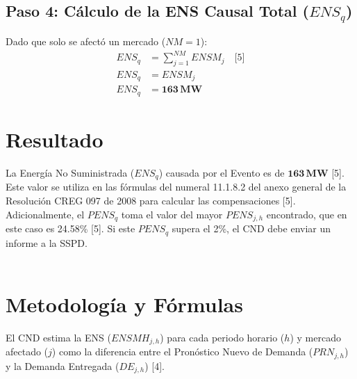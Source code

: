 \documentclass[a5paper]{book}%
\begin{document}
  \subsection*{Paso 4: Cálculo de la ENS Causal Total ($ENS_q$)}
  
  Dado que solo se afectó un mercado ($NM=1$):
  \begin{align*}
  	ENS_q &= \sum_{j=1}^{NM} ENSM_j \quad \text{[5]} \\
  	ENS_q &= ENSM_j \\
  	ENS_q &= \mathbf{163 \, \text{MW}}
  \end{align*}
  
  \section*{Resultado}
  
  La Energía No Suministrada ($ENS_q$) causada por el Evento es de $\mathbf{163 \, \text{MW}}$ [5]. Este valor se utiliza en las fórmulas del numeral 11.1.8.2 del anexo general de la Resolución CREG 097 de 2008 para calcular las compensaciones [5]. Adicionalmente, el $PENS_q$ toma el valor del mayor $PENS_{j,h}$ encontrado, que en este caso es 24.58\% [5]. Si este $PENS_q$ supera el 2\%, el CND debe enviar un informe a la SSPD.\\\\
  


    
  \section*{Metodología y Fórmulas}
  
  El CND estima la ENS ($ENSMH_{j,h}$) para cada periodo horario ($h$) y mercado afectado ($j$) como la diferencia entre el Pronóstico Nuevo de Demanda ($PRN_{j,h}$) y la Demanda Entregada ($DE_{j,h}$) [4].
  
\end{document}
